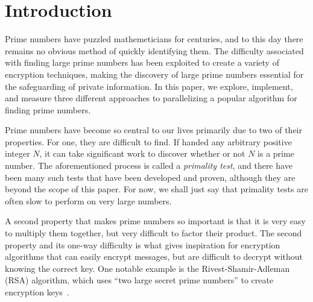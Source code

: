 \documentclass[11pt,twocolumn]{article}
\begin{document}
\section {Introduction} 




Prime numbers have puzzled mathemeticians for centuries, and to this day there
remains no obvious method of quickly identifying them. The difficulty associated 
with finding large prime numbers has been exploited to create a variety of 
encryption techniques, making the discovery of large prime numbers essential 
for the safeguarding of private information. In this paper, we explore, implement, and
measure three different approaches to parallelizing a popular algorithm
for finding prime numbers.

Prime numbers have become so central to our lives primarily due
to two of their properties. For one, they are difficult to find. If handed
any arbitrary positive integer $N$, it can take significant work
to discover whether or not $N$ is a prime number. The aforementioned process is called
a \textit{primality test}, and there have been many such tests
that have been developed and proven, although they are beyond the
scope of this paper. For now, we shall just say that primality tests
are often slow to perform on very large numbers.

A second property that makes prime numbers so important is that it is very
easy to multiply them together, but very difficult to factor their product.
The second property and its one-way difficulty is what gives inspiration for
encryption algorithms that can easily encrypt messages, but are difficult to 
decrypt without knowing the correct key. One notable example is the Rivest-Shamir-Adleman
(RSA) algorithm, which uses ``two large secret prime numbers'' to create
encryption keys~\cite{RSA}.
\end{document}
